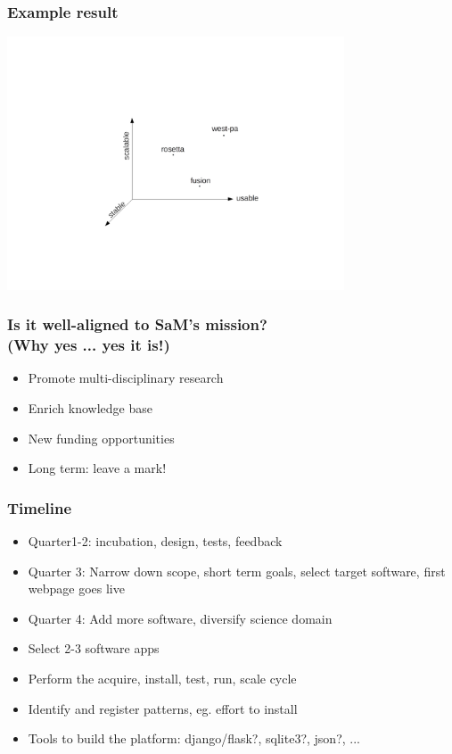 \documentclass[hyperref={pdfpagelabels=false},12pt]{beamer}
\begin{document}
\begin{frame}
\frametitle{Example result}
\includegraphics[width=10cm]{example1}
\end{frame}

\begin{frame}
\frametitle{Is it well-aligned to SaM's mission? \\ (Why yes ... yes it is!)}
\begin{itemize}
\itemsep1em
\item 
Promote multi-disciplinary research
\item
Enrich knowledge base
\item
New funding opportunities
\item
Long term: leave a mark!
\end{itemize}
\end{frame}

\begin{frame}
\frametitle{Timeline}
\begin{itemize}
\itemsep1em
\item 
Quarter1-2: incubation, design, tests, feedback
\item
Quarter 3: Narrow down scope, short term goals, select target software, first webpage goes live
\item
Quarter 4: Add more software, diversify science domain
\item
Select 2-3 software apps
\item
Perform the acquire, install, test, run, scale cycle
\item
Identify and register patterns, eg. effort to install
\item
Tools to build the platform: django/flask?, sqlite3?, json?, ...
\end{itemize}
\end{frame}
\end{document}
